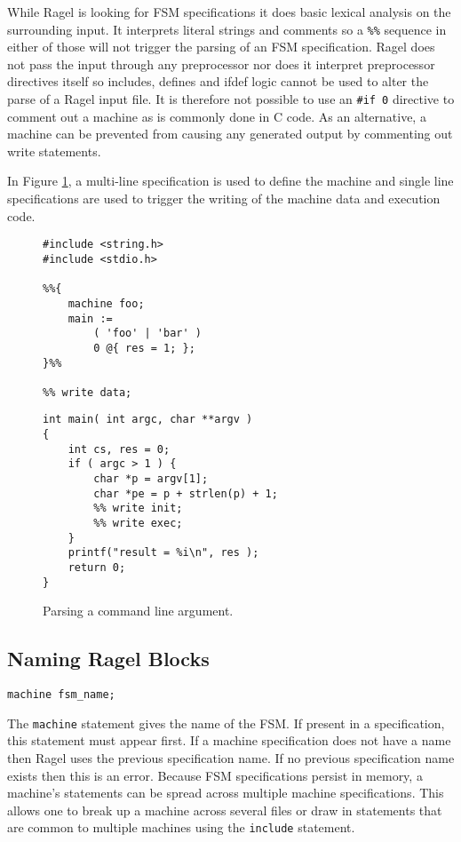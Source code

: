\documentclass[letterpaper,11pt,oneside]{book}
\newcommand{\verbspace}{\vspace{10pt}}
\begin{document}
While Ragel is looking for FSM specifications it does basic lexical analysis on
the surrounding input. It interprets literal strings and comments so a
\verb|%%| sequence in either of those will not trigger the parsing of an FSM
specification. Ragel does not pass the input through any preprocessor nor does it
interpret preprocessor directives itself so includes, defines and ifdef logic
cannot be used to alter the parse of a Ragel input file. It is therefore not
possible to use an \verb|#if 0| directive to comment out a machine as is
commonly done in C code. As an alternative, a machine can be prevented from
causing any generated output by commenting out write statements.

In Figure \ref{cmd-line-parsing}, a multi-line specification is used to define the
machine and single line specifications are used to trigger the writing of the machine
data and execution code.

\begin{figure}
\small
\begin{multicols}{2}
\begin{verbatim}
#include <string.h>
#include <stdio.h>

%%{ 
    machine foo;
    main := 
        ( 'foo' | 'bar' ) 
        0 @{ res = 1; };
}%%

%% write data;
\end{verbatim}
\columnbreak
\begin{verbatim}
int main( int argc, char **argv )
{
    int cs, res = 0;
    if ( argc > 1 ) {
        char *p = argv[1];
        char *pe = p + strlen(p) + 1;
        %% write init;
        %% write exec;
    }
    printf("result = %i\n", res );
    return 0;
}
\end{verbatim}
\end{multicols}
\caption{Parsing a command line argument.
}
\label{cmd-line-parsing}
\end{figure}

\subsection{Naming Ragel Blocks}

\begin{verbatim}
machine fsm_name;
\end{verbatim}
\verbspace

The \verb|machine| statement gives the name of the FSM. If present in a
specification, this statement must appear first. If a machine specification
does not have a name then Ragel uses the previous specification name.  If no
previous specification name exists then this is an error. Because FSM
specifications persist in memory, a machine's statements can be spread across
multiple machine specifications.  This allows one to break up a machine across
several files or draw in statements that are common to multiple machines using
the \verb|include| statement.
\end{document}

